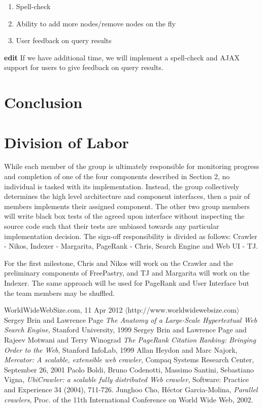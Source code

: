 \documentclass[11pt, letterpaper, oneside, twocolumn]{article}
\begin{document}
\begin{enumerate}
\item Spell-check
\item Ability to add more nodes/remove nodes on the fly
\item User feedback on query results
\end{enumerate}


\textbf{edit}
If we have additional time, we will implement a spell-check and AJAX support for users to give feedback on query results.


\section{Conclusion}
\label{sec:conculsion}

\section{ Division of Labor }
\label{sec:labor}

While each member of the group is ultimately responsible for monitoring progress and completion of one of the four components described in Section 2, no individual is tasked with its implementation.
Instead, the group collectively determines the high level architecture and component interfaces, then a pair of members implements their assigned component.
The other two group members will write black box tests of the agreed upon interface without inspecting the source code such that their tests are unbiased towards any particular implementation decision.
The sign-off responsibility is divided as follows: Crawler - Nikos, Indexer - Margarita, PageRank - Chris, Search Engine and Web UI - TJ.

For the first milestone, Chris and Nikos will work on the Crawler and the preliminary components of FreePastry, and TJ and Margarita will work on the Indexer.
The same approach will be used for PageRank and User Interface but the team members may be shuffled.

\begin{thebibliography}{9}

   WorldWideWebSize.com, 11 Apr 2012 $\langle$http://www.worldwidewebsize.com$\rangle$
   Sergey Brin and Lawrence Page \emph{The Anatomy of a Large-Scale Hypertextual Web Search Engine}, Stanford University, 1999
   Sergey Brin and  Lawrence Page and Rajeev Motwani and Terry Winograd \emph{The PageRank Citation Ranking: Bringing Order to the Web}, Stanford InfoLab, 1999
   Allan Heydon and Marc Najork, \emph{Mercator: A scalable, extensible web crawler}, Compaq Systems Research Center, September 26, 2001
   Paolo Boldi, Bruno Codenotti, Massimo Santini, Sebastiano Vigna, \emph{UbiCrawler: a scalable fully distributed Web crawler}, Software: Practice and Experience 34 (2004), 711-726.
   Junghoo Cho, H\'{e}ctor Garcia-Molina, \emph{Parallel crawlers}, Proc. of the 11th International Conference on World Wide Web, 2002.


\end{thebibliography}
\end{document}
